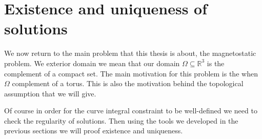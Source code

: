 \documentclass[12pt,a4paper]{article}
\numberwithin{equation}{subsection}
\numberwithin{lemma}{subsection}
\theoremstyle{definition}
\newcommand{\aop}{\mathscr{A}}
\newcommand{\lpcoho}{H^k_{p,dR}}
\newcommand{\omegabar}{\overline{\Omega}}
\newcommand{\real}{\mathbb{R}}
\newcommand{\rop}{\mathscr{R}} %
\begin{document}






\section{Existence and uniqueness of solutions}

We now return to the main problem that this thesis is about, the magnetostatic 
problem. We exterior domain we mean that our domain $\Omega \subseteq \real^3$
is the complement of a compact set. The main motivation for this problem is 
the when $\Omega$ complement of a torus. This is also the motivation behind the
topological assumption that we will give. 

Of course in order for the curve integral constraint to be well-defined 
we need to check the regularity of solutions. Then using the tools we developed
in the previous sections we will proof existence and uniqueness.
\end{document}

